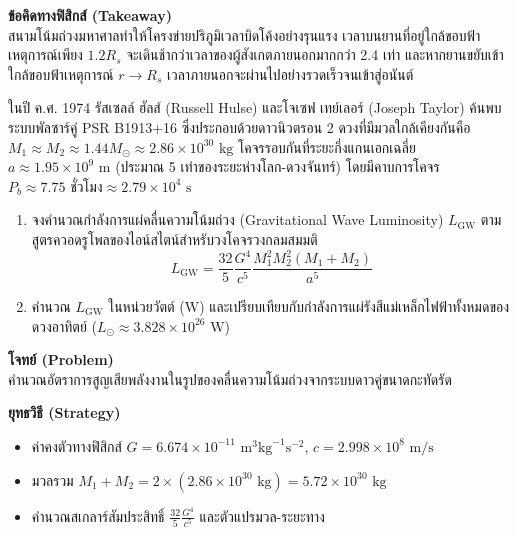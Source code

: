 \begin{psctexample}
\textbf{ข้อคิดทางฟิสิกส์ (Takeaway)} \\
สนามโน้มถ่วงมหาศาลทำให้โครงข่ายปริภูมิเวลาบิดโค้งอย่างรุนแรง เวลาบนยานที่อยู่ใกล้ขอบฟ้าเหตุการณ์เพียง $1.2 R_s$ จะเดินช้ากว่าเวลาของผู้สังเกตภายนอกมากกว่า 2.4 เท่า และหากยานขยับเข้าใกล้ขอบฟ้าเหตุการณ์ $r \to R_s$ เวลาภายนอกจะผ่านไปอย่างรวดเร็วจนเข้าสู่อนันต์
\qedexam
\end{psctexample}

\begin{psctexample}
ในปี ค.ศ. 1974 รัสเซลล์ ฮัลส์ (Russell Hulse) และโจเซฟ เทย์เลอร์ (Joseph Taylor) ค้นพบระบบพัลซาร์คู่ PSR B1913+16 ซึ่งประกอบด้วยดาวนิวตรอน 2 ดวงที่มีมวลใกล้เคียงกันคือ $M_1 \approx M_2 \approx 1.44 M_\odot \approx 2.86 \times 10^{30}\text{ kg}$ โคจรรอบกันที่ระยะกึ่งแกนเอกเฉลี่ย $a \approx 1.95 \times 10^9\text{ m}$ (ประมาณ 5 เท่าของระยะห่างโลก-ดวงจันทร์) โดยมีคาบการโคจร $P_b \approx 7.75\text{ ชั่วโมง} \approx 2.79 \times 10^4\text{ s}$
\begin{enumerate}
    \item จงคำนวณกำลังการแผ่คลื่นความโน้มถ่วง (Gravitational Wave Luminosity) $L_{\text{GW}}$ ตามสูตรควอดรูโพลของไอน์สไตน์สำหรับวงโคจรวงกลมสมมติ
    \begin{equation}
    L_{\text{GW}} = \frac{32}{5} \frac{G^4}{c^5} \frac{M_1^2 M_2^2 (M_1 + M_2)}{a^5}
    \end{equation}
    \item คำนวณ $L_{\text{GW}}$ ในหน่วยวัตต์ ($\text{W}$) และเปรียบเทียบกับกำลังการแผ่รังสีแม่เหล็กไฟฟ้าทั้งหมดของดวงอาทิตย์ ($L_\odot \approx 3.828 \times 10^{26}\text{ W}$)
\end{enumerate}

\textbf{โจทย์ (Problem)} \\
คำนวณอัตราการสูญเสียพลังงานในรูปของคลื่นความโน้มถ่วงจากระบบดาวคู่ขนาดกะทัดรัด

\textbf{ยุทธวิธี (Strategy)} \\
\begin{itemize}
    \item ค่าคงตัวทางฟิสิกส์ $G = 6.674 \times 10^{-11}\text{ m}^3\text{kg}^{-1}\text{s}^{-2}$, $c = 2.998 \times 10^8\text{ m/s}$
    \item มวลรวม $M_1 + M_2 = 2 \times (2.86 \times 10^{30}\text{ kg}) = 5.72 \times 10^{30}\text{ kg}$
    \item คำนวณสเกลาร์สัมประสิทธิ์ $\frac{32}{5}\frac{G^4}{c^5}$ และตัวแปรมวล-ระยะทาง
\end{itemize}


\end{psctexample}
